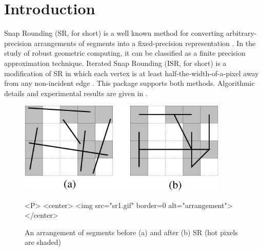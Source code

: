 \newcommand{\reals}{{\rm I\!\hspace{-0.025em} R}}

\def\A{{\cal A}}
\def\S{{\cal S}}

\section{Introduction}
Snap Rounding (SR, for short) is a well known method for converting
arbitrary-precision arrangements of segments into a fixed-precision
representation \cite{gght-srlse-97, gm-rad-98, h-psifp-99}. In
the study of robust geometric computing, it can be classified
as a finite precision approximation technique. Iterated Snap Rounding
(ISR, for short) is a modification of SR in which each vertex is at least
half-the-width-of-a-pixel away from any non-incident edge
\cite{cgal:hp-isr-02}. This package supports both methods. Algorithmic
details and experimental results are given in \cite{cgal:hp-isr-02}.

\begin{figure}
\begin{ccTexOnly}
\centerline{\includegraphics[width=10cm]{Snap_rounding_2/sr1.ps}}
\end{ccTexOnly}

\caption{An arrangement of segments before (a) and after (b)
SR (hot pixels are shaded)}
\label{fig:sr1}

\begin{ccHtmlOnly}
<P>
<center>
  <img src="sr1.gif"  border=0 alt="arrangement">
</center>
\end{ccHtmlOnly}
\end{figure}

